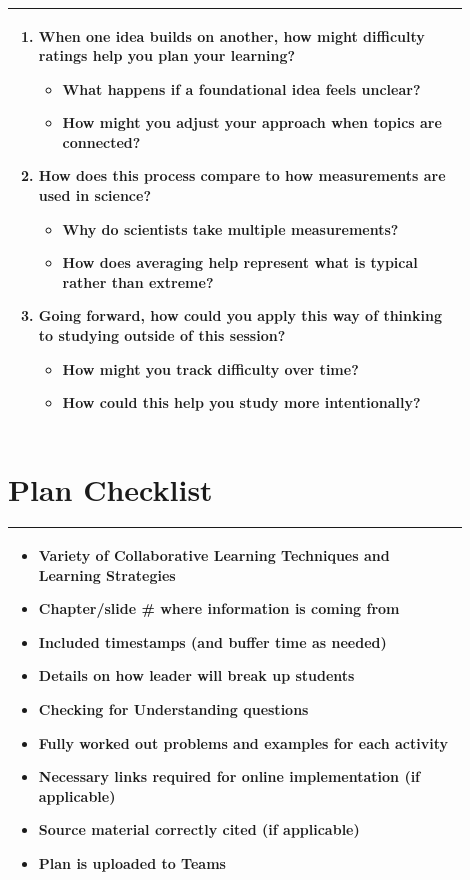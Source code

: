 \documentclass{article}
\begin{document}
\begin{tabular}{|p{0.9\linewidth}|}
\begin{enumerate}
    \item When one idea builds on another, how might difficulty ratings help you plan your learning?
    \begin{itemize}
        \item What happens if a foundational idea feels unclear?
        \item How might you adjust your approach when topics are connected?
    \end{itemize}

    \item How does this process compare to how measurements are used in science?
    \begin{itemize}
        \item Why do scientists take multiple measurements?
        \item How does averaging help represent what is typical rather than extreme?
    \end{itemize}

    \item Going forward, how could you apply this way of thinking to studying outside of this session?
    \begin{itemize}
        \item How might you track difficulty over time?
        \item How could this help you study more intentionally?
    \end{itemize}
\end{enumerate} \\
\hline
\end{tabular}

\newpage
\section*{Plan Checklist}

\begin{tabular}{|p{0.9\linewidth}|}
\hline
\begin{itemize}
\item[$\Box$] Variety of Collaborative Learning Techniques and Learning Strategies
\item[$\Box$] Chapter/slide \# where information is coming from
\item[$\Box$] Included timestamps (and buffer time as needed)
\item[$\Box$] Details on how leader will break up students
\item[$\Box$] Checking for Understanding questions
\item[$\Box$] Fully worked out problems and examples for each activity
\item[$\Box$] Necessary links required for online implementation (if applicable)
\item[$\Box$] Source material correctly cited (if applicable)
\item[$\Box$] Plan is uploaded to Teams
\end{itemize}
\\ \hline
\end{tabular}
\end{document}
